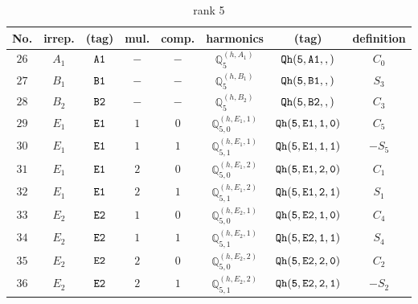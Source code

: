 \documentclass[fleqn,8pt]{jsarticle}
\begin{document}
\begin{table}[ht!]
\begin{center}
\caption{rank 5}
\renewcommand{\arraystretch}{1.3}
\begin{tabular}{cccccccc} \hline \hline
No. & irrep. & (tag) & mul. & comp. & harmonics & (tag) & definition \\ \hline
$ 26 $ & $ A_{1} $ & $ {\tt A1} $ & $ - $ & $ - $ & $ \mathbb{Q}_{5}^{(h,A_{1})} $ & $ {\tt Qh(5,A1,,)} $ & $ C_{0} $ \\
$ 27 $ & $ B_{1} $ & $ {\tt B1} $ & $ - $ & $ - $ & $ \mathbb{Q}_{5}^{(h,B_{1})} $ & $ {\tt Qh(5,B1,,)} $ & $ S_{3} $ \\
$ 28 $ & $ B_{2} $ & $ {\tt B2} $ & $ - $ & $ - $ & $ \mathbb{Q}_{5}^{(h,B_{2})} $ & $ {\tt Qh(5,B2,,)} $ & $ C_{3} $ \\
$ 29 $ & $ E_{1} $ & $ {\tt E1} $ & $ 1 $ & $ 0 $ & $ \mathbb{Q}_{5,0}^{(h,E_{1},1)} $ & $ {\tt Qh(5,E1,1,0)} $ & $ C_{5} $ \\
$ 30 $ & $ E_{1} $ & $ {\tt E1} $ & $ 1 $ & $ 1 $ & $ \mathbb{Q}_{5,1}^{(h,E_{1},1)} $ & $ {\tt Qh(5,E1,1,1)} $ & $ - S_{5} $ \\
$ 31 $ & $ E_{1} $ & $ {\tt E1} $ & $ 2 $ & $ 0 $ & $ \mathbb{Q}_{5,0}^{(h,E_{1},2)} $ & $ {\tt Qh(5,E1,2,0)} $ & $ C_{1} $ \\
$ 32 $ & $ E_{1} $ & $ {\tt E1} $ & $ 2 $ & $ 1 $ & $ \mathbb{Q}_{5,1}^{(h,E_{1},2)} $ & $ {\tt Qh(5,E1,2,1)} $ & $ S_{1} $ \\
$ 33 $ & $ E_{2} $ & $ {\tt E2} $ & $ 1 $ & $ 0 $ & $ \mathbb{Q}_{5,0}^{(h,E_{2},1)} $ & $ {\tt Qh(5,E2,1,0)} $ & $ C_{4} $ \\
$ 34 $ & $ E_{2} $ & $ {\tt E2} $ & $ 1 $ & $ 1 $ & $ \mathbb{Q}_{5,1}^{(h,E_{2},1)} $ & $ {\tt Qh(5,E2,1,1)} $ & $ S_{4} $ \\
$ 35 $ & $ E_{2} $ & $ {\tt E2} $ & $ 2 $ & $ 0 $ & $ \mathbb{Q}_{5,0}^{(h,E_{2},2)} $ & $ {\tt Qh(5,E2,2,0)} $ & $ C_{2} $ \\
$ 36 $ & $ E_{2} $ & $ {\tt E2} $ & $ 2 $ & $ 1 $ & $ \mathbb{Q}_{5,1}^{(h,E_{2},2)} $ & $ {\tt Qh(5,E2,2,1)} $ & $ - S_{2} $ \\
 \hline \hline
\end{tabular}
\end{center}
\end{table}
\end{document}
